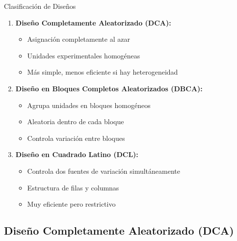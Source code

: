 \documentclass[aspectratio=169]{beamer}
\begin{document}
\begin{frame}{Clasificación de Diseños}
\begin{enumerate}
\item \textbf{Diseño Completamente Aleatorizado (DCA):}
\begin{itemize}
\item Asignación completamente al azar
\item Unidades experimentales homogéneas
\item Más simple, menos eficiente si hay heterogeneidad
\end{itemize}

\vspace{0.2cm}

\item \textbf{Diseño en Bloques Completos Aleatorizados (DBCA):}
\begin{itemize}
\item Agrupa unidades en bloques homogéneos
\item Aleatoria dentro de cada bloque
\item Controla variación entre bloques
\end{itemize}

\vspace{0.2cm}

\item \textbf{Diseño en Cuadrado Latino (DCL):}
\begin{itemize}
\item Controla dos fuentes de variación simultáneamente
\item Estructura de filas y columnas
\item Muy eficiente pero restrictivo
\end{itemize}
\end{enumerate}
\end{frame}

\subsection{Diseño Completamente Aleatorizado (DCA)}
\end{document}
